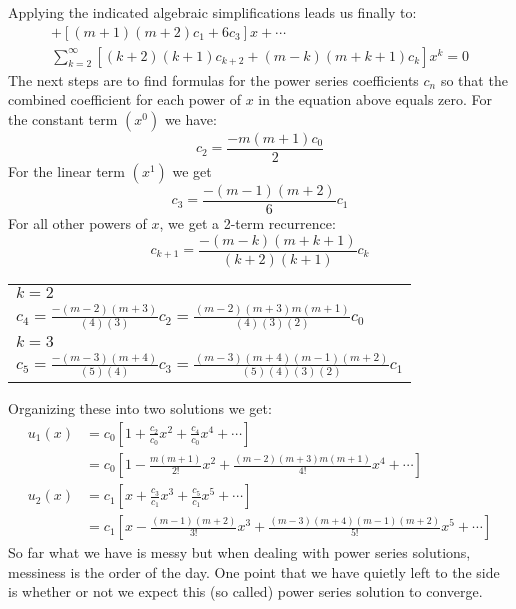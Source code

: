 Applying the indicated algebraic simplifications leads us finally to:
\begin{multline*}
[m(m+1)c_0+2c_2] + [(m+1)(m+2)c_1 + 6c_3]x + \cdots \\
\sum\limits_{k=2}^{\infty}[(k+2)(k+1)c_{k+2} + (m-k)(m+k+1)c_k]x^k=0
\end{multline*}
The next steps are to find formulas for the power series coefficients $c_n$ so that the combined coefficient for each power of $x$ in the equation above equals zero. For the constant term $(x^0)$ we have:
\begin{equation*}
c_2 = \frac{-m(m+1)c_0}{2}
\end{equation*}
For the linear term $(x^1)$ we get
\begin{equation*}
c_3 = \frac{-(m-1)(m+2)}{6}c_1
\end{equation*}
For all other powers of $x$, we get a 2-term recurrence:
\begin{equation*}
c_{k+1} = \frac{-(m-k)(m+k+1)}{(k+2)(k+1)}c_k
\end{equation*}
\begin{margintable}
\begin{tabular}{l}
$k=2$ \\
$c_4 = \frac{-(m-2)(m+3)}{(4)(3)}c_2 = \frac{(m-2)(m+3)m(m+1)}{(4)(3)(2)}c_0$ \\
$k=3$ \\
$c_5 = \frac{-(m-3)(m+4)}{(5)(4)}c_3 = \frac{(m-3)(m+4)(m-1)(m+2)}{(5)(4)(3)(2)}c_1$ \\
\end{tabular}
\end{margintable}
Organizing these into two solutions we get:
\begin{align*}
u_1(x) &= c_0\left[1 + \frac{c_2}{c_0}x^2 + \frac{c_4}{c_0}x^4 + \cdots \right] \\
&= c_0 \left[1-\frac{m(m+1)}{2!}x^2 + \frac{(m-2)(m+3)m(m+1)}{4!}x^4 + \cdots  \right] \\
u_2(x) &= c_1\left[x + \frac{c_3}{c_1}x^3 + \frac{c_5}{c_1}x^5 + \cdots \right] \\
&= c_1\left[x - \frac{(m-1)(m+2)}{3!}x^3+\frac{(m-3)(m+4)(m-1)(m+2)}{5!}x^5 + \cdots \right]
\end{align*}
So far what we have is messy but when dealing with power series solutions, messiness is the order of the day.  One point that we have quietly left to the side is whether or not we expect this (so called) power series solution  to converge.

